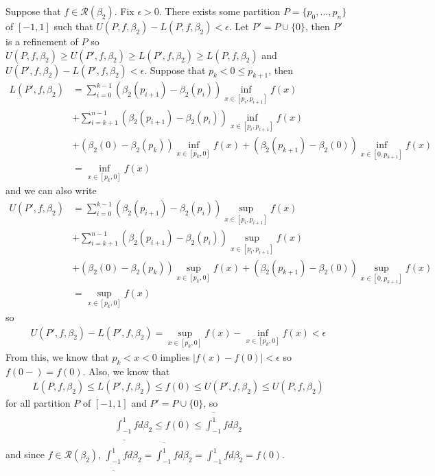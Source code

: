 \documentclass{scrartcl}
\begin{document}
Suppose that \(f \in \mathscr{R}(\beta_2)\).
Fix \(\epsilon > 0\).
There exists some partition \(P = \{p_0, \dots, p_n\}\) of \([-1, 1]\) such that \(U(P, f, \beta_2) - L(P, f, \beta_2) < \epsilon\).
Let \(P' = P \cup \{0\}\), then \(P'\) is a refinement of \(P\) so \(U(P, f, \beta_2) \geq U(P', f, \beta_2) \geq L(P', f, \beta_2) \geq L(P, f, \beta_2)\) and \(U(P', f, \beta_2) - L(P', f, \beta_2) < \epsilon\).
Suppose that \(p_k < 0 \leq p_{k + 1}\), then
\begin{align*}
  L(P', f, \beta_2)
  &= \sum^{k - 1}_{i = 0} (\beta_2(p_{i + 1}) - \beta_2(p_i)) \inf_{x \in [p_i, p_{i + 1}]} f(x) \\
  &+ \sum^{n - 1}_{i = k + 1} (\beta_2(p_{i + 1}) - \beta_2(p_i)) \inf_{x \in [p_i, p_{i + 1}]} f(x) \\
  &+ (\beta_2(0) - \beta_2(p_k)) \inf_{x \in [p_k, 0]} f(x)
  + (\beta_2(p_{k + 1}) - \beta_2(0)) \inf_{x \in [0, p_{k + 1}]} f(x) \\
  &= \inf_{x \in [p_k, 0]} f(x)
\end{align*}
and we can also write
\begin{align*}
  U(P', f, \beta_2)
  &= \sum^{k - 1}_{i = 0} (\beta_2(p_{i + 1}) - \beta_2(p_i)) \sup_{x \in [p_i, p_{i + 1}]} f(x) \\
  &+ \sum^{n - 1}_{i = k + 1} (\beta_2(p_{i + 1}) - \beta_2(p_i)) \sup_{x \in [p_i, p_{i + 1}]} f(x) \\
  &+ (\beta_2(0) - \beta_2(p_k)) \sup_{x \in [p_k, 0]} f(x)
  + (\beta_2(p_{k + 1}) - \beta_2(0)) \sup_{x \in [0, p_{k + 1}]} f(x) \\
  &= \sup_{x \in [p_k, 0]} f(x)
\end{align*}
so
\begin{align*}
  U(P', f, \beta_2) - L(P', f, \beta_2)
  = \sup_{x \in [p_k, 0]} f(x) - \inf_{x \in [p_k, 0]} f(x) < \epsilon
\end{align*}
From this, we know that \(p_k < x < 0\) implies \(|f(x) - f(0)| < \epsilon\) so \(f(0-) = f(0)\).
Also, we know that
\begin{align*}
  L(P, f, \beta_2) \leq L(P', f, \beta_2) \leq f(0) \leq U(P', f, \beta_2) \leq U(P, f, \beta_2)
\end{align*}
for all partition \(P\) of \([-1, 1]\) and \(P' = P \cup \{0\}\), so
\begin{align*}
  \underline{\int^1_{-1}} f d\beta_2 \leq f(0) \leq \overline{\int^1_{-1}} f d\beta_2
\end{align*}
and since \(f \in \mathscr{R}(\beta_2)\), \(\underline{\int^1_{-1}} f d\beta_2 = \overline{\int^1_{-1}} f d\beta_2 = \int^1_{-1} f d\beta_2 = f(0)\).
\end{document}

